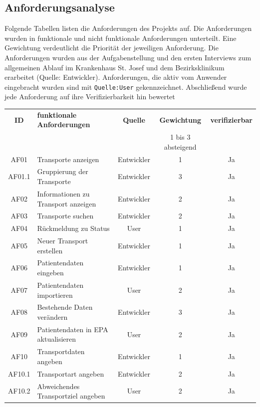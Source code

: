 \documentclass[a4paper, ngerman, 12pt]{scrartcl}
\begin{document}
\subsection{Anforderungsanalyse}
Folgende Tabellen listen die Anforderungen des Projekts auf. Die Anforderungen wurden in funktionale und nicht funktionale Anforderungen unterteilt. Eine Gewichtung verdeutlicht die Priorität der jeweiligen Anforderung. Die Anforderungen wurden aus der Aufgabenstellung und den ersten Interviews zum allgemeinen Ablauf im Krankenhaus St. Josef und dem Bezirksklinikum erarbeitet (Quelle: Entwickler). Anforderungen, die aktiv vom Anwender eingebracht wurden sind mit \texttt{Quelle:User} gekennzeichnet. Abschließend wurde jede Anforderung auf ihre Verifizierbarkeit hin bewertet\\[0.5em]
 \begin{adjustbox}{max width=\textwidth}
\begin{tabular}{|c|l|c|c|c|}
\hline
\rowcolor{lightgray}\textbf{ID}	&\textbf{funktionale Anforderungen}	&\textbf{Quelle}&\textbf{Gewichtung}	&\textbf{verifizierbar}\\
\rowcolor{lightgray}	&						&		&\scriptsize{1 bis 3 absteigend}			&\\
\hline
AF01&Transporte anzeigen						&Entwickler		&1		&Ja\\
\hline
AF01.1&Gruppierung der Transporte						&Entwickler		&3		&Ja\\
\hline
AF02&Informationen zu Transport anzeigen
						&Entwickler		&2		&Ja\\
\hline
AF03&Transporte suchen
						&Entwickler		&2		&Ja\\
\hline
AF04&Rückmeldung zu Status
						&User		&1		&Ja\\
\hline
AF05&Neuer Transport erstellen
						&Entwickler		&1		&Ja\\
\hline
AF06&Patientendaten eingeben
						&Entwickler		&1		&Ja\\
\hline
AF07&Patientendaten importieren
						&User		&2		&Ja\\
\hline
AF08&Bestehende Daten verändern
						&Entwickler		&3		&Ja\\
\hline
AF09&Patientendaten in EPA aktualisieren
						&User		&2		&Ja\\
\hline
AF10&Transportdaten angeben
						&Entwickler		&1		&Ja\\
\hline
AF10.1&Transportart angeben
						&Entwickler		&2		&Ja\\
\hline
AF10.2&Abweichendes Transportziel angeben
						&User		&2		&Ja\\

\end{tabular}
\end{adjustbox}
\end{document}
